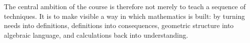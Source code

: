 The central ambition of the course is therefore not merely to teach a sequence of
techniques. It is to make visible a way in which mathematics is built: by turning
needs into definitions, definitions into consequences, geometric structure into
algebraic language, and calculations back into understanding.
